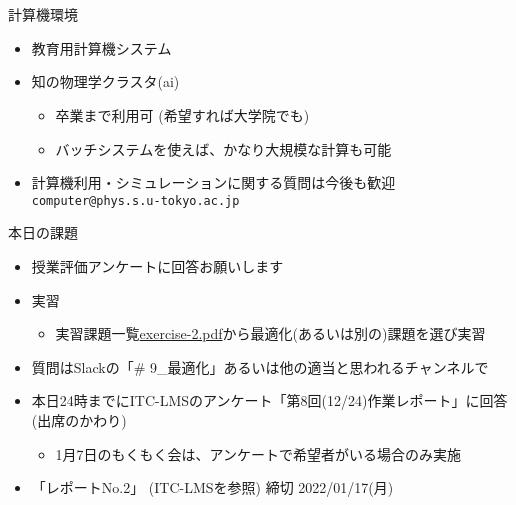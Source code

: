 \documentclass[10pt,dvipdfmx]{beamer}
\begin{document}
\section{}

\begin{frame}[t,fragile]{計算機環境}
  \begin{itemize}
  \item 教育用計算機システム
  \item 知の物理学クラスタ(ai)
    \begin{itemize}
    \item 卒業まで利用可 (希望すれば大学院でも)
    \item バッチシステムを使えば、かなり大規模な計算も可能
    \end{itemize}
  \item 計算機利用・シミュレーションに関する質問は今後も歓迎 {\tt computer@phys.s.u-tokyo.ac.jp}
  \end{itemize}
\end{frame}



\begin{frame}[t]{本日の課題}
  \begin{itemize}
  \item 授業評価アンケートに回答お願いします
  \item 実習
    \begin{itemize}
    \item 実習課題一覧\href{https://github.com/todo-group/ComputerExperiments/releases/tag/2021a-computer2}{exercise-2.pdf}から最適化(あるいは別の)課題を選び実習
    \end{itemize}
  \item 質問はSlackの「\# 9\_最適化」あるいは他の適当と思われるチャンネルで
  \item 本日24時までにITC-LMSのアンケート「第8回(12/24)作業レポート」に回答(出席のかわり)
    \begin{itemize}
    \item 1月7日のもくもく会は、アンケートで希望者がいる場合のみ実施
    \end{itemize}
  \item 「レポートNo.2」 (ITC-LMSを参照) 締切 2022/01/17(月)
  \end{itemize}
\end{frame}
\end{document}
